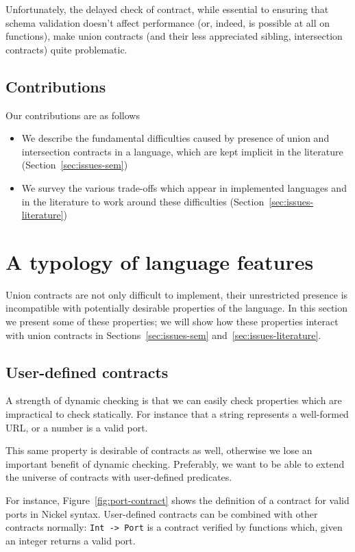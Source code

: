 \documentclass[sigplan,10pt,review,anonymous]{acmart}
\newcommand{\nickel}[1]{\lstinline[language=nickel]{#1}}
\begin{document}
Unfortunately, the delayed check of contract, while essential to
ensuring that schema validation doesn't affect performance (or, indeed,
is possible at all on functions), make union contracts (and their less
appreciated sibling, intersection contracts) quite problematic.

\subsection{Contributions}
Our contributions are as follows
\begin{itemize}
\item We describe the fundamental difficulties caused by presence of
  union and intersection contracts in a language, which are kept
  implicit in the literature (Section~\ref{sec:issues-sem})
\item We survey the various trade-offs which appear in implemented
  languages and in the literature to work around these difficulties
  (Section~\ref{sec:issues-literature})
\end{itemize}

\section{A typology of language features}
\label{sec:feat-lang}

Union contracts are not only difficult to implement, their
unrestricted presence is incompatible with potentially desirable
properties of the language. In this section we present some of these
properties; we will show how these properties interact with union
contracts in Sections~\ref{sec:issues-sem}
and~\ref{sec:issues-literature}.

\subsection{User-defined contracts}
\label{sec:flat-contracts}

A strength of dynamic checking is that we can easily check properties which
are impractical to check statically. For instance that a string
represents a well-formed URL, or a number is a valid port.

This same property is desirable of contracts as well, otherwise we
lose an important benefit of dynamic checking. Preferably, we want to
be able to extend the universe of contracts with user-defined
predicates.

For instance, Figure~\ref{fig:port-contract} shows the definition of a
contract for valid ports in Nickel syntax.
%
User-defined contracts can be combined with other contracts normally:
\nickel{Int -> Port} is a contract verified by functions
which, given an integer returns a valid port.
\end{document}
